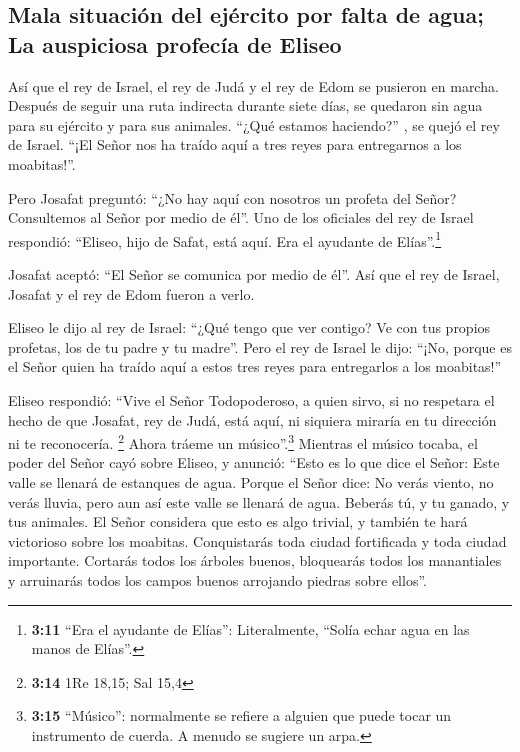 \hypertarget{mala-situaciuxf3n-del-ejuxe9rcito-por-falta-de-agua-la-auspiciosa-profecuxeda-de-eliseo}{%
\subsection{Mala situación del ejército por falta de agua; La auspiciosa
profecía de
Eliseo}\label{mala-situaciuxf3n-del-ejuxe9rcito-por-falta-de-agua-la-auspiciosa-profecuxeda-de-eliseo}}

 Así que el rey de Israel, el rey de Judá y el rey de Edom
se pusieron en marcha. Después de seguir una ruta indirecta durante
siete días, se quedaron sin agua para su ejército y para sus animales.
 ``¿Qué estamos haciendo?'' , se quejó el rey de Israel.
``¡El Señor nos ha traído aquí a tres reyes para entregarnos a los
moabitas!''.

 Pero Josafat preguntó: ``¿No hay aquí con nosotros un
profeta del Señor? Consultemos al Señor por medio de él''. Uno de los
oficiales del rey de Israel respondió: ``Eliseo, hijo de Safat, está
aquí. Era el ayudante de Elías''.\footnote{\textbf{3:11} ``Era el
  ayudante de Elías'': Literalmente, ``Solía echar agua en las manos de
  Elías''.}

 Josafat aceptó: ``El Señor se comunica por medio de
él''. Así que el rey de Israel, Josafat y el rey de Edom fueron a verlo.

 Eliseo le dijo al rey de Israel: ``¿Qué tengo que ver
contigo? Ve con tus propios profetas, los de tu padre y tu madre''. Pero
el rey de Israel le dijo: ``¡No, porque es el Señor quien ha traído aquí
a estos tres reyes para entregarlos a los moabitas!''

 Eliseo respondió: ``Vive el Señor Todopoderoso, a quien
sirvo, si no respetara el hecho de que Josafat, rey de Judá, está aquí,
ni siquiera miraría en tu dirección ni te reconocería. \footnote{\textbf{3:14}
  1Re 18,15; Sal 15,4}  Ahora tráeme un
músico''.\footnote{\textbf{3:15} ``Músico'': normalmente se refiere a
  alguien que puede tocar un instrumento de cuerda. A menudo se sugiere
  un arpa.} Mientras el músico tocaba, el poder del Señor cayó sobre
Eliseo,  y anunció: ``Esto es lo que dice el Señor: Este
valle se llenará de estanques de agua. Porque el Señor dice:
 No verás viento, no verás lluvia, pero aun así este
valle se llenará de agua. Beberás tú, y tu ganado, y tus animales.
 El Señor considera que esto es algo trivial, y también
te hará victorioso sobre los moabitas.  Conquistarás toda
ciudad fortificada y toda ciudad importante. Cortarás todos los árboles
buenos, bloquearás todos los manantiales y arruinarás todos los campos
buenos arrojando piedras sobre ellos''.


